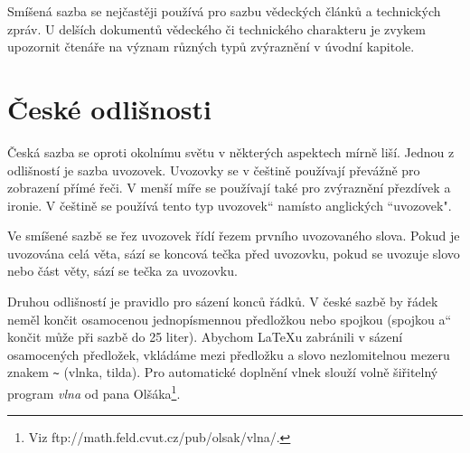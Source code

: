 \documentclass[11pt, twocolumn, a4paper]{article}
\providecommand{\uv}[1]{\quotedblbase #1\textquotedblleft}
\begin{document}
Smíšená sazba se nejčastěji používá pro sazbu vě\-deckých článků a technických zpráv. U delších dokumentů vědeckého či technického charakteru je zvykem upozornit čtenáře na význam různých typů zvýraznění v úvodní kapitole.

\section{České odlišnosti}

Česká sazba se oproti okolnímu světu v některých aspektech mírně liší. Jednou z odlišností je sazba uvozovek. Uvozovky se v češtině použí\-vají převážně pro zobrazení přímé řeči. V menší míře se používají také pro zvýrazně\-ní přezdívek a ironie. V češtině se pou\-ží\-vá tento \uv{typ uvozovek} namísto anglických ``uvozo\-vek".

Ve smíšené sazbě se řez uvozovek řídí řezem prv\-ní\-ho uvozovaného slova. Pokud je uvozována celá věta, sází se koncová tečka před uvozovku, pokud se uvo\-zuje slovo nebo část věty, sází se tečka za uvozovku.

Druhou odlišností je pravidlo pro sázení konců řádků. V české sazbě by řádek neměl končit osamocenou jednopísmennou předložkou nebo spojkou (spojkou \uv{a} končit může při sazbě do 25 liter). Abychom \LaTeX u zabránili v sázení osamocených předložek, vkládáme mezi předložku a slovo nezlomitelnou mezeru znakem \texttt{\textasciitilde} (vlnka, tilda). Pro automatické doplnění vlnek slouží volně šiřitelný program \emph{vlna} od pana Olšáka\footnote{Viz ftp://math.feld.cvut.cz/pub/olsak/vlna/.}.
\end{document}
